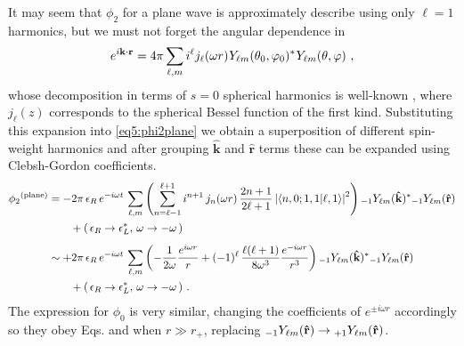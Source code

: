 It may seem that $\phi_2$ for a plane wave is approximately describe using only $\ell=1$ harmonics, but we must not forget the angular dependence in
\begin{align}
    e^{i \mathbf{k} \cdot \mathbf{r}} = 4 \pi \sum_{\ell,m} i^\ell j_\ell(\omega r) \uu{Y}{\ell m}(\theta_0,\varphi_0)^{*} \uu{Y}{\ell m}(\theta,\varphi) ~,
\end{align}
whose decomposition in terms of $s=0$ spherical harmonics is well-known \cite{Jackson1998}, where $j_\ell(z)$ corresponds to the spherical Bessel function of the first kind.
Substituting this expansion into \eqref{eq5:phi2plane} we obtain a superposition of different spin-weight harmonics and after grouping $\mathbf{\hat{k}}$ and $\mathbf{\hat{r}}$ terms these can be expanded using Clebsh-Gordon coefficients.
\begin{align}
    \label{eq5:phi2planeExpanded}
    \begin{split}
        \phi_2{}^{(\mathrm{plane})} &= - 2 \pi \,\epsilon_R \,e^{-i \omega t} \,\sum_{\ell,m} \left(
        \sum_{n=\ell-1}^{\ell+1} i^{n + 1} \,j_n(\omega r) \,\frac{2n + 1}{2\ell + 1} 
        \left|\langle n,0 ; 1,1 | \ell,1 \rangle\right|^2 \right)
        \uu[-1]{Y}{\ell m}(\mathbf{\hat{k}})^{*} \uu[-1]{Y}{\ell m}(\mathbf{\hat{r}}) \\
        & \qquad + ( \,\epsilon_R \to \epsilon_L^*, \,\omega \to -\omega \,) \\[0.15cm]
        &\sim + 2 \pi \,\epsilon_R \,e^{-i \omega t} \,\sum_{\ell,m} \left(
        -\frac{1}{2 \omega} \frac{e^{i \omega r}}{r} 
        + (-1)^\ell \,\frac{\ell(\ell+1)}{8 \omega^3} \frac{e^{-i \omega r}}{r^3} \right)
        \uu[-1]{Y}{\ell m}(\mathbf{\hat{k}})^{*} \uu[-1]{Y}{\ell m}(\mathbf{\hat{r}}) \\
        & \qquad + (\,\epsilon_R \to \epsilon_L^*, \,\omega \to -\omega \,) ~.
    \end{split}
\end{align}
The expression for $\phi_0$ is very similar, changing the coefficients of $e^{\pm i \omega r}$ accordingly so they obey Eqs.  and  when $r \gg r_{+}$, replacing $\uu[-1]{Y}{\ell m}(\mathbf{\hat{r}})\to\uu[+1]{Y}{\ell m}(\mathbf{\hat{r}})$.

